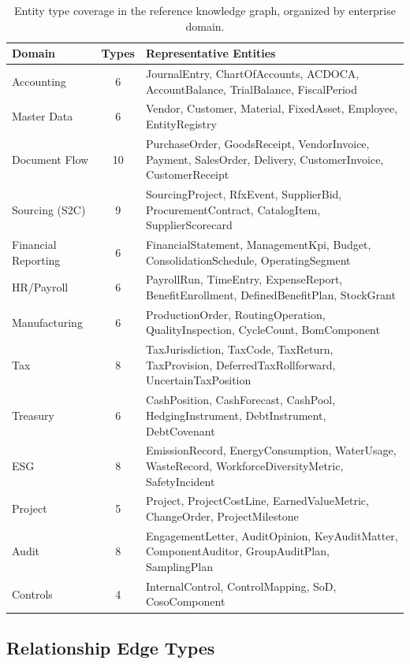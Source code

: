 \begin{table}[t]
\centering
\caption{Entity type coverage in the reference knowledge graph,
  organized by enterprise domain.}
\label{tab:entity_types}
\small
\begin{tabular}{lcp{8cm}}
\toprule
\textbf{Domain} & \textbf{Types} & \textbf{Representative Entities} \\
\midrule
Accounting & 6 & JournalEntry, ChartOfAccounts, ACDOCA,
  AccountBalance, TrialBalance, FiscalPeriod \\
Master Data & 6 & Vendor, Customer, Material, FixedAsset,
  Employee, EntityRegistry \\
Document Flow & 10 & PurchaseOrder, GoodsReceipt, VendorInvoice,
  Payment, SalesOrder, Delivery, CustomerInvoice,
  CustomerReceipt \\
Sourcing (S2C) & 9 & SourcingProject, RfxEvent, SupplierBid,
  ProcurementContract, CatalogItem, SupplierScorecard \\
Financial Reporting & 6 & FinancialStatement, ManagementKpi,
  Budget, ConsolidationSchedule, OperatingSegment \\
HR/Payroll & 6 & PayrollRun, TimeEntry, ExpenseReport,
  BenefitEnrollment, DefinedBenefitPlan, StockGrant \\
Manufacturing & 6 & ProductionOrder, RoutingOperation,
  QualityInspection, CycleCount, BomComponent \\
Tax & 8 & TaxJurisdiction, TaxCode, TaxReturn,
  TaxProvision, DeferredTaxRollforward, UncertainTaxPosition \\
Treasury & 6 & CashPosition, CashForecast, CashPool,
  HedgingInstrument, DebtInstrument, DebtCovenant \\
ESG & 8 & EmissionRecord, EnergyConsumption, WaterUsage,
  WasteRecord, WorkforceDiversityMetric, SafetyIncident \\
Project & 5 & Project, ProjectCostLine, EarnedValueMetric,
  ChangeOrder, ProjectMilestone \\
Audit & 8 & EngagementLetter, AuditOpinion, KeyAuditMatter,
  ComponentAuditor, GroupAuditPlan, SamplingPlan \\
Controls & 4 & InternalControl, ControlMapping, SoD,
  CosoComponent \\
\bottomrule
\end{tabular}
\end{table}

\subsection{Relationship Edge Types}
\label{sec:kg_edges}

